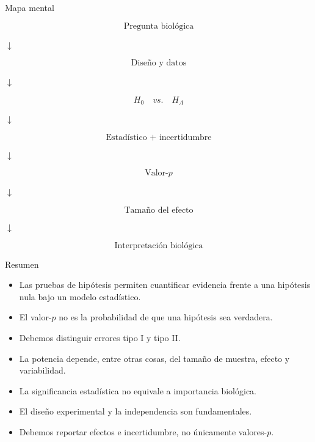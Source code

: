 \documentclass[aspectratio=169,11pt]{beamer}
\begin{document}
\begin{frame}{Mapa mental}

\begin{center}
\Large

\[
\boxed{\text{Pregunta biológica}}
\]

$\downarrow$

\[
\boxed{\text{Diseño y datos}}
\]

$\downarrow$

\[
\boxed{H_0\quad vs.\quad H_A}
\]

$\downarrow$

\[
\boxed{\text{Estadístico + incertidumbre}}
\]

$\downarrow$

\[
\boxed{\text{Valor-}p}
\]

$\downarrow$

\[
\boxed{\text{Tamaño del efecto}}
\]

$\downarrow$

\[
\boxed{\text{Interpretación biológica}}
\]

\end{center}

\end{frame}

\begin{frame}{Resumen}

\begin{itemize}
    \item Las pruebas de hipótesis permiten cuantificar evidencia
    frente a una hipótesis nula bajo un modelo estadístico.
    \item El valor-$p$ no es la probabilidad de que una hipótesis sea
    verdadera.
    \item Debemos distinguir errores tipo I y tipo II.
    \item La potencia depende, entre otras cosas, del tamaño de muestra,
    efecto y variabilidad.
    \item La significancia estadística no equivale a importancia biológica.
    \item El diseño experimental y la independencia son fundamentales.
    \item Debemos reportar efectos e incertidumbre, no únicamente
    valores-$p$.
\end{itemize}

\end{frame}
\end{document}
